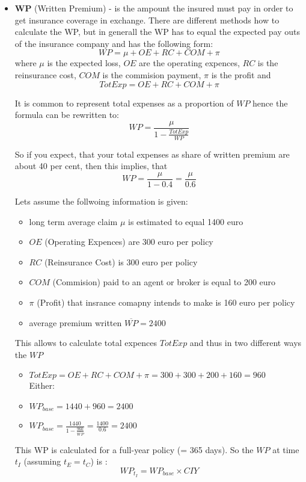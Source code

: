 \documentclass[11pt,a4paper,fleqn]{article}      %
\begin{document}
\begin{itemize}
\item \textbf{WP} (Written Premium) - is the ampount the insured must pay in order to get insurance coverage in exchange. There are different methods how to calculate the WP, but in generall the WP has to equal the expected pay outs of the insurance company and has the following form:
$$WP=\mu +OE +RC+COM+\pi $$ 
where $\mu$ is the expected loss, $OE$ are the operating expences, $RC$ is the reinsurance cost, $COM$ is the commision payment, $\pi$ is the profit and 
$$TotExp=OE+RC+COM+\pi$$

It is common to represent total expenses as a proportion of $WP$ hence the formula can be rewritten to:
$$WP=\frac{\mu }{1-\frac{TotExp}{WP}}$$ 

So if you expect, that your total expenses as share of written premium are about 40 per cent, then this implies, that 
$$WP=\frac{\mu}{1-0.4}=\frac{\mu}{0.6}$$

Lets assume the follwoing information is given:
\begin{itemize}
\item long term average claim $\mu$ is estimated to equal 1400 euro
\item $OE$ (Operating Expences) are 300 euro per policy
\item $RC$ (Reinsurance Cost) is 300 euro per policy
\item $COM$ (Commision) paid to an agent or broker is equal to 200 euro
\item $\pi$ (Profit) that insrance comapny intends to make is 160 euro per policy
\item average premium written $\overline{WP}=2400$
\end{itemize}

This allows to calculate total expences $TotExp$ and thus in two different ways the $WP$

\begin{itemize}
\item $TotExp=OE+RC+COM+\pi=300+300+200+160=960$
\\Either: 
\item $WP_{base}= 1440 +960=2400 $
\item $WP_{base}=\frac{1440}{1-\frac{960}{\overline{WP}}}=\frac{1400}{0.6}=2400$
\end{itemize}

This WP is calculated for a full-year policy (= 365 days). So the $WP$ at time $t_I$ (assuming $t_E=t_C$) is :
$$WP_{t_I}=WP_{base} \times CIY$$


\end{itemize}
\end{document}
